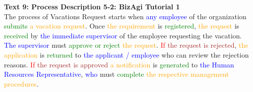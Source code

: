 \textbf{Text 9: Process Description 5-2: BizAgi Tutorial 1}\\
The process of Vacations Request starts when \textcolor{blue}{any} \textcolor{blue}{employee} of the organization \textcolor{green}{submits} \textcolor{orange}{a} \textcolor{orange}{vacation} \textcolor{orange}{request}. Once \textcolor{orange}{the} \textcolor{orange}{requirement} is \textcolor{green}{registered}, \textcolor{orange}{the} \textcolor{orange}{request} is \textcolor{green}{received} by \textcolor{blue}{the} \textcolor{blue}{immediate} \textcolor{blue}{supervisor} of the employee requesting the vacation. \textcolor{blue}{The} \textcolor{blue}{supervisor} must \textcolor{green}{approve} \textcolor{green}{or} \textcolor{green}{reject} \textcolor{orange}{the} \textcolor{orange}{request}. \textcolor{red}{If} \textcolor{brown}{the} \textcolor{brown}{request} \textcolor{brown}{is} \textcolor{brown}{rejected}, \textcolor{orange}{the} \textcolor{orange}{application} is \textcolor{green}{returned} to \textcolor{blue}{the} \textcolor{blue}{applicant} \textcolor{blue}{/} \textcolor{blue}{employee} who can review the rejection reasons. \textcolor{red}{If} \textcolor{brown}{the} \textcolor{brown}{request} \textcolor{brown}{is} \textcolor{brown}{approved} \textcolor{orange}{a} \textcolor{orange}{notification} is \textcolor{green}{generated} to \textcolor{blue}{the} \textcolor{blue}{Human} \textcolor{blue}{Resources} \textcolor{blue}{Representative}, \textcolor{blue}{who} must \textcolor{green}{complete} \textcolor{orange}{the} \textcolor{orange}{respective} \textcolor{orange}{management} \textcolor{orange}{procedures}.

